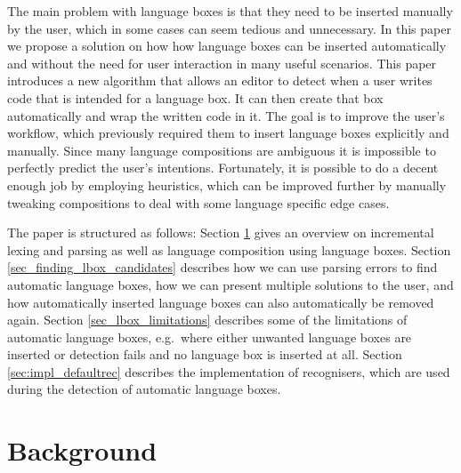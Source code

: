 \documentclass[sigplan,screen]{acmart}\settopmatter{printfolios=true,printccs=false,printacmref=false}
\begin{document}
The main problem with language boxes is that they need to be inserted manually
by the user, which in some cases can seem tedious and unnecessary. In this
paper we propose a solution on how how language boxes can be inserted
automatically and without the need for user interaction in many useful
scenarios. This paper introduces a new algorithm that allows an editor to
detect when a user writes code that is intended for a language box. It can then
create that box automatically and wrap the written code in it. The goal is to
improve the user's workflow, which previously required them to insert language
boxes explicitly and manually.  Since many language compositions are ambiguous
it is impossible to perfectly predict the user's intentions. Fortunately, it is
possible to do a decent enough job by employing heuristics, which can be
improved further by manually tweaking compositions to deal with some language
specific edge cases.

The paper is structured as follows: Section \ref{sec_background} gives an
overview on incremental lexing and parsing as well as language composition
using language boxes. Section \ref{sec_finding_lbox_candidates}
describes how we can use parsing errors to find automatic language boxes, how
we can present multiple solutions to the user, and how automatically inserted
language boxes can also automatically be removed again. Section
\ref{sec_lbox_limitations} describes some of the limitations of automatic
language boxes, e.g.~where either unwanted language boxes are inserted or
detection fails and no language box is inserted at all. Section
\ref{sec:impl_defaultrec} describes the implementation of recognisers, which
are used during the detection of automatic language boxes.

\section{Background}
\label{sec_background}
\end{document}
